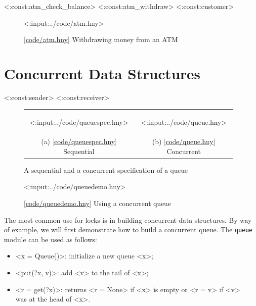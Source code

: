 \documentclass{report}
\newcommand{\harmonylink}[1]{%
[\href{https://harmony.cs.cornell.edu/#1}{\underline{#1}}]%
}
\newenvironment{code}{
\tcolorbox
}{
\endtcolorbox
}
\begin{document}
<{:const:atm_check_balance}>
<{:const:atm_withdraw}>
<{:const:customer}>

\begin{figure}
\begin{code}
<{:input:../code/atm.hny}>
\end{code}
\caption{\harmonylink{code/atm.hny} Withdrawing money from an ATM}
\label{fig:atm}
\end{figure}

\chapter{Concurrent Data Structures}
\label{ch:cds}

<{:const:sender}>
<{:const:receiver}>

\begin{figure}[h]
\begin{center}
\begin{tabular}{cc}
\begin{tcolorbox}[width=0.42\linewidth]
<{:input:../code/queuespec.hny}>
\end{tcolorbox}
&
\begin{tcolorbox}[width=0.53\linewidth]
<{:input:../code/queue.hny}>
\end{tcolorbox}
\\
(a) \harmonylink{code/queuespec.hny} Sequential & (b) \harmonylink{code/queue.hny} Concurrent
\end{tabular}
\end{center}
\caption{A sequential and a concurrent specification of a queue}
\label{fig:queues}
\end{figure}

\begin{figure}
\begin{code}
<{:input:../code/queuedemo.hny}>
\end{code}
\caption{\harmonylink{code/queuedemo.hny} Using a concurrent queue}
\label{fig:queuedemo}
\end{figure}

The most common use for locks is in building concurrent data structures.
By way of example, we will first demonstrate how to build a concurrent queue.
The \texttt{queue} module can be used as follows:
\begin{itemize}
\item <{x = Queue()}>: initialize a new queue <{x}>;
\item <{put(?x, v)}>: add <{v}> to the tail of <{x}>;
\item <{r = get(?x)}>: returns <{r = None}>
if <{x}> is empty or <{r = v}> if <{v}> was at the head of <{x}>.
\end{itemize}
\end{document}

